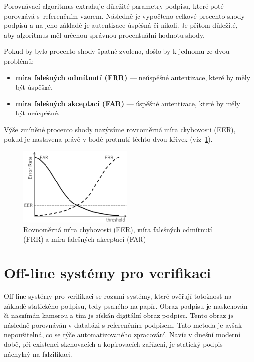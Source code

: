 Porovnávací algoritmus extrahuje důležité parametry podpisu, které poté porovnává s~referenčním vzorem. 
Následně je vypočteno celkové procento shody podpisů a na jeho základě je autentizace úspěšná či nikoli.
Je přitom důležité, aby algoritmus měl určenou správnou procentuální hodnotu shody. 

Pokud by bylo procento shody špatně zvoleno, došlo by k jednomu ze dvou problémů:
\begin{itemize}
  \item \textbf{míra falešných odmítnutí (FRR)} --- neúspěšné autentizace, které by měly být úspěšné.
  \item \textbf{míra falešných akceptací (FAR)} --- úspěšné autentizace, které by měly být neúspěšné.
\end{itemize}

Výše zmíněné procento shody nazýváme rovnoměrná míra chybovosti (EER), pokud je nastavena právě v bodě protnutí těchto dvou křivek (viz~\ref{fig:FAR_FRR}).

\begin{figure}[h]\label{fig:FAR_FRR}
  \centering
  \includegraphics[width=0.5\textwidth]{obrazky-figures/FAR_FRR.png}
  \caption{Rovnoměrná míra chybovosti (EER), míra falešných odmítnutí (FRR) a míra falešných akceptací (FAR)} %
\end{figure}

\newpage

\section{Off-line systémy pro verifikaci}
Off-line systémy pro verifikaci se rozumí systémy, které ověřují totožnost na základě statického podpisu, tedy psaného na papír.  %
Obraz podpisu je naskenován či nasnímán kamerou a tím je získán digitální obraz podpisu.                                          %
Tento obraz je následně porovnáván v databázi s referenčním podpisem.                                                             %
Tato metoda je avšak nepoužitelná, co se týče automatizovaného zpracování.                                                        %
Navíc v dnešní moderní době, při existenci skenovacích a kopírovacích zařízení, je statický podpis náchylný na falzifikaci.       %

